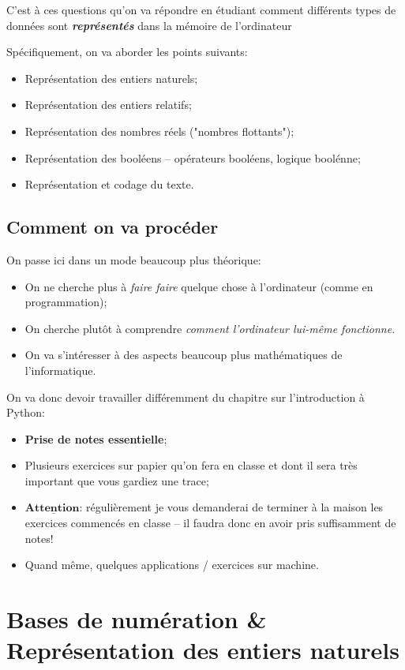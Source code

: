 \documentclass[12pt]{article}
\begin{document}
	C'est à ces questions qu'on va répondre en étudiant comment différents types de données sont \textbf{\textit{représentés}} dans la mémoire de l'ordinateur
	
	Spécifiquement, on va aborder les points suivants:
	\begin{itemize}
		\item Représentation des entiers naturels;
		\item Représentation des entiers relatifs;
		\item Représentation des nombres réels ("nombres flottants");
		\item Représentation des booléens -- opérateurs booléens, logique boolénne;
		\item Représentation et codage du texte.
	\end{itemize}
	
	\subsection{Comment on va procéder}
	On passe ici dans un mode beaucoup plus théorique:
	\begin{itemize}
		\item On ne cherche plus à \textit{faire faire} quelque chose à l'ordinateur (comme en programmation);
		\item On cherche plutôt à comprendre \textit{comment l'ordinateur lui-même fonctionne}.
		\item On va s'intéresser à des aspects beaucoup plus mathématiques de l'informatique.
	\end{itemize}
	\vspace{\baselineskip}
	On va donc devoir travailler différemment du chapitre sur l'introduction à Python:
	 \begin{itemize}
	 	\item \textbf{Prise de notes essentielle};
	 	\item Plusieurs exercices sur papier qu'on fera en classe et dont il sera très important que vous gardiez une trace;
	 	\item $\underline{\textbf{Attention:}}$ régulièrement je vous demanderai de terminer à la maison les exercices commencés en classe -- il faudra donc en avoir pris suffisamment de notes!
	 	\item Quand même, quelques applications / exercices sur machine.
	 \end{itemize}
	 
	 \pagebreak
	 
	 \section{Bases de numération \& Représentation des entiers naturels}
	 
\end{document}
